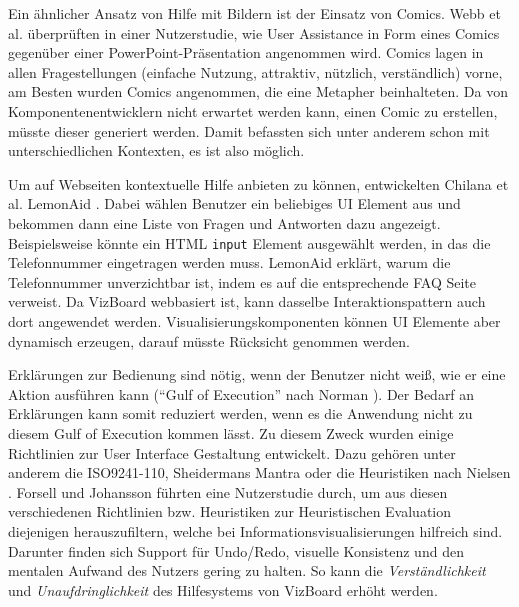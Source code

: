 \documentclass[
	headsepline,
	footsepline,
	fontsize=12pt,
	bibliography=totoc
]{scrbook}
\begin{document}

Ein ähnlicher Ansatz von Hilfe mit Bildern ist der Einsatz von Comics. Webb et al. \cite{Webb2012} überprüften in einer Nutzerstudie, wie User Assistance in Form eines Comics gegenüber einer PowerPoint-Präsentation angenommen wird. Comics lagen in allen Fragestellungen (einfache Nutzung, attraktiv, nützlich, verständlich) vorne, am Besten wurden Comics angenommen, die eine Metapher beinhalteten. Da von Komponentenentwicklern nicht erwartet werden kann, einen Comic zu erstellen, müsste dieser generiert werden. Damit befassten sich unter anderem schon \cite{Kurlander1996, Shamir2006, Chan2009, Wen2012} mit unterschiedlichen Kontexten, es ist also möglich.


Um auf Webseiten kontextuelle Hilfe anbieten zu können, entwickelten Chilana et al. LemonAid \cite{Chilana2012}. Dabei wählen Benutzer ein beliebiges UI Element aus und bekommen dann eine Liste von Fragen und Antworten dazu angezeigt. Beispielsweise könnte ein HTML \texttt{input} Element ausgewählt werden, in das die Telefonnummer eingetragen werden muss. LemonAid erklärt, warum die Telefonnummer unverzichtbar ist, indem es auf die entsprechende FAQ Seite verweist. Da VizBoard webbasiert ist, kann dasselbe Interaktionspattern auch dort angewendet werden. Visualisierungskomponenten können UI Elemente aber dynamisch erzeugen, darauf müsste Rücksicht genommen werden.  



Erklärungen zur Bedienung sind nötig, wenn der Benutzer nicht weiß, wie er eine Aktion ausführen kann (\enquote{Gulf of Execution} nach Norman \cite{Norman1986}). Der Bedarf an Erklärungen kann somit reduziert werden, wenn es die Anwendung nicht zu diesem Gulf of Execution kommen lässt. Zu diesem Zweck wurden einige Richtlinien zur User Interface Gestaltung entwickelt. Dazu gehören unter anderem die ISO9241-110, Sheidermans Mantra \cite{Shneiderman1996} oder die Heuristiken nach Nielsen \cite{Nielsen1994}. Forsell und Johansson \cite{Forsell2010} führten eine Nutzerstudie durch, um aus diesen verschiedenen Richtlinien bzw. Heuristiken zur Heuristischen Evaluation \cite{Nielsen1994} diejenigen herauszufiltern, welche bei Informationsvisualisierungen hilfreich sind. Darunter finden sich Support für Undo/Redo, visuelle Konsistenz und den mentalen Aufwand des Nutzers gering zu halten. So kann die \emph{Verständlichkeit} und \emph{Unaufdringlichkeit} des Hilfesystems von VizBoard erhöht werden.
\end{document}
